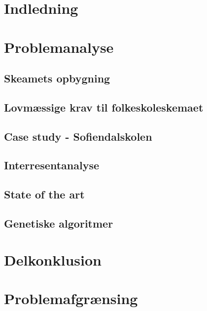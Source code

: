 \section{Indledning}
  

\newpage
\section{Problemanalyse}
  

  \subsection{Skeamets opbygning}
    

  \subsection{Lovmæssige krav til folkeskoleskemaet}
    

  \subsection{Case study - Sofiendalskolen}
    

  \subsection{Interresentanalyse}
    

  \subsection{State of the art}
    

  \subsection {Genetiske algoritmer}
    

\section{Delkonklusion}
    

\newpage
\section{Problemafgrænsing}
    

